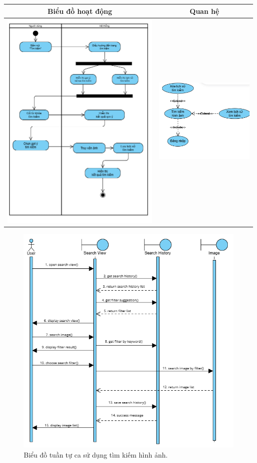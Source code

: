 \vspace{0.8cm}

\noindent 
\begin{tabular}{| c | c |}
    \hline
    \textbf{Biểu đồ hoạt động} & \textbf{Quan hệ} \\ 
    \hline
    \includegraphics[width=0.6\linewidth]{figures/c3/3-3-16-activity-diagram.png} 
    &  
    \includegraphics[width=0.35\linewidth]{figures/c3/3-3-16-relationship.png} \\ 
    \hline
\end{tabular}

\begin{figure}[H]
    \centering  
    \includegraphics[width=1.1\textwidth]{figures/c3/3-3-16-sequence-diagram.png}
    \caption{Biểu đồ tuần tự ca sử dụng tìm kiếm hình ảnh.}
    \label{fig:3-3-16-sequence-diagram}
\end{figure}